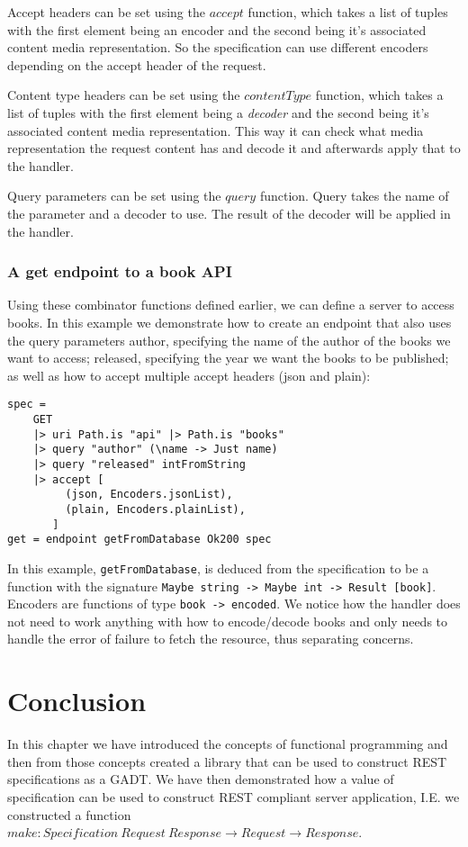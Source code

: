 Accept headers can be set using the $accept$ function, which takes a list of
tuples with the first element being an encoder and the second being it's
associated content media representation. So the specification can use different
encoders depending on the accept header of the request.

Content type headers can be set using the $contentType$ function, which takes a
list of tuples with the first element being a \textit{decoder} and the second
being it's associated content media representation. This way it can check what
media representation the request content has and decode it and afterwards apply
that to the handler. 

Query parameters can be set using the $query$ function. Query takes the name of
the parameter and a decoder to use. The result of the decoder will be applied in
the handler.

\subsubsection{A get endpoint to a book API}

Using these combinator functions defined earlier, we can define a server to
access books. In this example we demonstrate how to create an endpoint that also
uses the query parameters author, specifying the name of the author of the books
we want to access; released, specifying the year we want the books to be
published; as well as how to accept multiple accept headers (json and plain):


\begin{lstlisting}
spec = 
    GET
    |> uri Path.is "api" |> Path.is "books"
    |> query "author" (\name -> Just name)
    |> query "released" intFromString
    |> accept [
         (json, Encoders.jsonList),
         (plain, Encoders.plainList),
       ]
get = endpoint getFromDatabase Ok200 spec
\end{lstlisting}

In this example, \texttt{getFromDatabase}, is deduced from the specification to
be a function with the signature \texttt{Maybe string -> Maybe int -> Result
[book]}. Encoders are functions of type \texttt{book -> encoded}. We notice how
the handler does not need to work anything with how to encode/decode books and
only needs to handle the error of failure to fetch the resource, thus separating
concerns.


\section{Conclusion}

In this chapter we have introduced the concepts of functional programming and
then from those concepts created a library that can be used to construct REST
specifications as a GADT. We have then demonstrated how a value of specification
can be used to construct REST compliant server application, I.E. we constructed
a function $make : Specification\ Request\ Response \rightarrow Request\rightarrow Response$.
